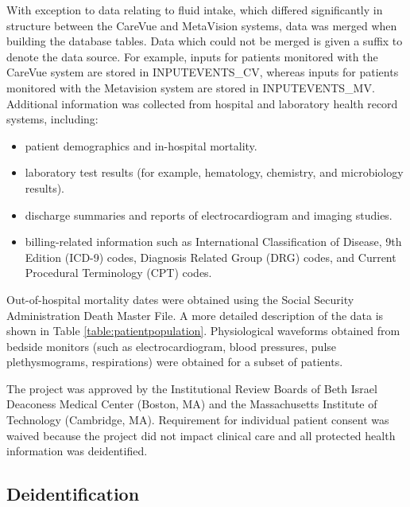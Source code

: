 \documentclass[english]{article}
\begin{document}
With exception to data relating to fluid intake, which differed significantly in structure between the CareVue and MetaVision systems, data was merged when building the database tables. Data which could not be merged is given a suffix to denote the data source. For example, inputs for patients monitored with the CareVue system are stored in INPUTEVENTS\_CV, whereas inputs for patients monitored with the Metavision system are stored in INPUTEVENTS\_MV. Additional information was collected from hospital and laboratory health record systems, including:
\begin{itemize}
  \item patient demographics and in-hospital mortality.
  \item laboratory test results (for example, hematology, chemistry, and microbiology results).
  \item discharge summaries and reports of electrocardiogram and imaging studies.
  \item billing-related information such as International Classification of Disease, 9th Edition (ICD-9) codes, Diagnosis Related Group (DRG) codes, and Current Procedural Terminology (CPT) codes.
\end{itemize}
Out-of-hospital mortality dates were obtained using the Social Security Administration Death Master File. A more detailed description of the data is shown in Table \ref{table:patientpopulation}. Physiological waveforms obtained from bedside monitors (such as electrocardiogram, blood pressures, pulse plethysmograms, respirations) were obtained for a subset of patients. 

The project was approved by the Institutional Review Boards of Beth Israel Deaconess Medical Center (Boston, MA) and the Massachusetts Institute of Technology (Cambridge, MA). Requirement for individual patient consent was waived because the project did not impact clinical care and all protected health information was deidentified.

\subsection*{Deidentification}
\end{document}
